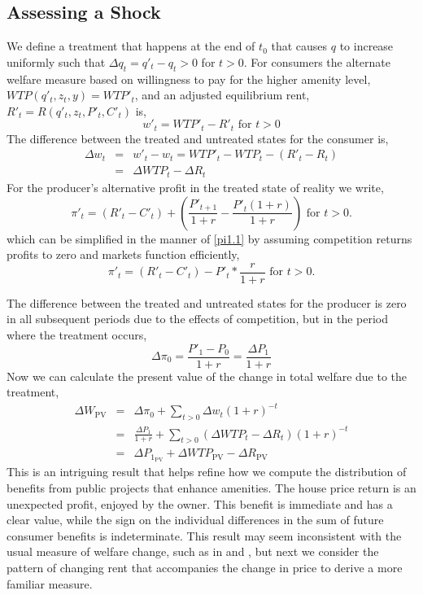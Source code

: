 \documentclass[ecta,nameyear,draft]{econsocart}
\theoremstyle{plain}
\theoremstyle{remark}
\begin{document}
\subsection{Assessing a Shock}
We define a treatment that happens at the end of $t_0$ that causes $q$ to increase uniformly such that $\Delta q_t=q'_t-q_t>0$ for $t>0$.
For consumers the alternate welfare measure based on willingness to pay for the higher amenity level,$\mathit{WTP}(q'_t,z_t,y)=\mathit{WTP'}_t$, and an adjusted equilibrium rent, $R'_t=R(q'_t,z_t,P'_t,C'_t)$ is,
\begin{equation*}
	w'_t=\mathit{WTP'}_t-R'_t \text{ for } t>0
\end{equation*}
The difference between the treated and untreated states for the consumer is,
\begin{eqnarray}
	\Delta w_t&=&w'_t-w_t=WTP'_t-WTP_t-(R'_t-R_t)\\
	&=&\Delta\mathit{WTP}_t-\Delta R_t
\end{eqnarray}
For the producer’s alternative profit in the treated state of reality we write,
\begin{equation*}
	\pi'_t = (R'_t-C'_t)+\left(\frac{P'_{t+1}}{1+r}-\frac{P'_t(1+r)}{1+r}\right)\text{ for } t>0.
\end{equation*}
which can be simplified in the manner of \ref{pi1.1} by assuming competition returns profits to zero and markets function efficiently,
\begin{equation}
\pi'_t = (R'_t-C'_t)-P'_t*\frac{r}{1+r}\text{ for } t>0.\label{pi2}
\end{equation}

The difference between the treated and untreated states for the producer is zero in all subsequent periods due to the effects of competition, but in the period where the treatment occurs,
\begin{equation}
	\Delta\pi_0=\frac{P'_1-P_0}{1+r}=\frac{\Delta P_1}{1+r}\label{pitzero}
\end{equation}
Now we can calculate the present value of the change in total welfare due to the treatment,
\begin{eqnarray}
	\Delta W_{\mathrm{PV}}&=&\Delta \pi_0+\sum_{t>0}\Delta w_t(1+r)^{-t}\nonumber\\
	&=&\frac{\Delta P_1}{1+r}+\sum_{t>0} (\Delta \mathit{WTP}_t-\Delta R_t)(1+r)^{-t} \label{deltaW1}\\
	&=&\Delta P_{1_{\mathrm{PV}}}+\Delta\mathit{WTP}_\mathrm{PV}-\Delta R_{\mathrm{PV}}\label{deltaW2}
\end{eqnarray}
This is an intriguing result that helps refine how we compute the distribution of benefits from public projects that enhance amenities. The house price return is an unexpected profit, enjoyed by the owner. This benefit is immediate and has a clear value, while the sign on the individual differences in the sum of future consumer benefits is indeterminate. This result may seem inconsistent with the usual measure of welfare change, such as in \cite{freeman14} and \cite{banzhaf20}, but next we consider the pattern of changing rent that accompanies the change in price to derive a more familiar measure. 
\end{document}
